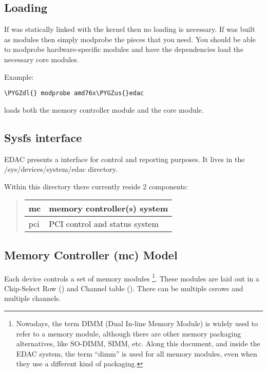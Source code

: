 \documentclass[a4paper,8pt,english]{sphinxmanual}
\def\PYGZus{\char`\_}
\def\PYGZdl{\char`\$}
\begin{document}
\subsection{Loading}
\label{admin-guide/ras:loading}
If  was statically linked with the kernel then no loading
is necessary. If  was built as modules then simply modprobe
the  pieces that you need. You should be able to modprobe
hardware-specific modules and have the dependencies load the necessary
core modules.

Example:

\begin{Verbatim}[commandchars=\\\{\}]
\PYGZdl{} modprobe amd76x\PYGZus{}edac
\end{Verbatim}

loads both the  memory controller module and the
 core module.


\subsection{Sysfs interface}
\label{admin-guide/ras:sysfs-interface}
EDAC presents a  interface for control and reporting purposes. It
lives in the /sys/devices/system/edac directory.

Within this directory there currently reside 2 components:
\begin{quote}

\begin{tabulary}{\linewidth}{|L|L|}
\hline

mc
 & 
memory controller(s) system
\\
\hline
pci
 & 
PCI control and status system
\\
\hline\end{tabulary}

\end{quote}


\subsection{Memory Controller (mc) Model}
\label{admin-guide/ras:memory-controller-mc-model}
Each  device controls a set of memory modules \footnote[4]{
Nowadays, the term DIMM (Dual In-line Memory Module) is widely
used to refer to a memory module, although there are other memory
packaging alternatives, like SO-DIMM, SIMM, etc. Along this document,
and inside the EDAC system, the term ``dimm'' is used for all memory
modules, even when they use a different kind of packaging.
}. These modules
are laid out in a Chip-Select Row () and Channel table ().
There can be multiple csrows and multiple channels.
\end{document}
